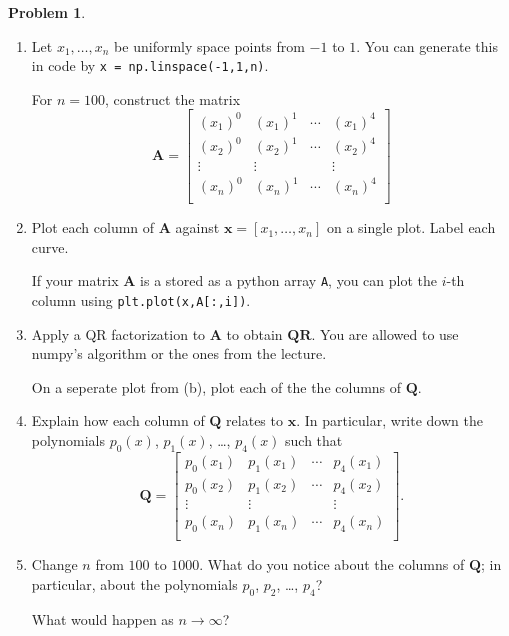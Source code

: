 \documentclass[12pt]{article}
\theoremstyle{definition}
\newtheorem{problem}{Problem}
\renewcommand{\vec}{\mathbf}
\begin{document}
\begin{problem}

    \begin{enumerate}
        \item
            Let $x_1, \ldots, x_n$ be uniformly space points from $-1$ to $1$.
            You can generate this in code by \lstinline{x = np.linspace(-1,1,n)}.

            For $n=100$, construct the matrix
            \[
                \vec{A} = 
                \begin{bmatrix}
                    (x_1)^0 & (x_1)^1 & \cdots & (x_1)^4 \\
                    (x_2)^0 & (x_2)^1 & \cdots & (x_2)^4 \\ 
                    \vdots & \vdots & & \vdots \\
                    (x_n)^0 & (x_n)^1 & \cdots & (x_n)^4 \\
                \end{bmatrix}
            \]
        \item 
            Plot each column of $\vec{A}$ against $\vec{x} = [x_1, \ldots, x_n]$ on a single plot. 
            Label each curve. 
            
            If your matrix $\vec{A}$ is a stored as a python array \lstinline{A}, you can plot the $i$-th column using \lstinline{plt.plot(x,A[:,i])}.

        \item Apply a QR factorization to $\vec{A}$ to obtain $\vec{Q}\vec{R}$. You are allowed to use numpy's algorithm or the ones from the lecture.

            On a seperate plot from (b), plot each of the the columns of $\vec{Q}$.

        \item 
            Explain how each column of $\vec{Q}$ relates to $\vec{x}$.
            In particular, write down the polynomials $p_0(x)$, $p_1(x)$, \ldots, $p_4(x)$ such that 
            \[
                \vec{Q} = 
                \begin{bmatrix}
                    p_0(x_1) & p_1(x_1) & \cdots & p_4(x_1) \\
                    p_0(x_2) & p_1(x_2) & \cdots & p_4(x_2) \\ 
                    \vdots & \vdots & & \vdots \\
                    p_0(x_n) & p_1(x_n) & \cdots & p_4(x_n) \\
                \end{bmatrix}.
            \]
        \item Change $n$ from $100$ to $1000$. 
            What do you notice about the columns of $\vec{Q}$; in particular, about the polynomials $p_0$, $p_2$, \ldots, $p_4$?
            
            What would happen as $n\to\infty$?
    \end{enumerate}

\end{problem}
\end{document}
